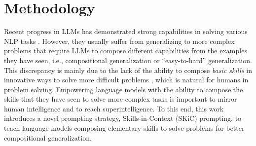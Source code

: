 





\section{Methodology}
\label{sec: methodology}














Recent progress in LLMs has demonstrated strong capabilities in solving various NLP tasks \citep{brown2020language, Radford2019LanguageMA, smith2022using, chowdhery2022palm, lewkowycz2022solving, sanh2021multitask, wei2021finetuned, mishra2022cross, chung2022scaling, ouyang2022training}. However, they usually suffer from generalizing to more complex problems that require LLMs to compose different capabilities \citep{zhou2022least} from the examples they have seen, i.e., compositional generalization or ``easy-to-hard'' generalization. This discrepancy is mainly due to the lack of the ability to compose \textit{basic skills} in innovative ways to solve more difficult problems \citep{dziri2023faith}, which is natural for humans in problem solving. Empowering language models with the ability to compose the skills that they have seen to solve more complex tasks is important to mirror human intelligence and to reach superintelligence. To this end, this work introduces a novel prompting strategy, Skills-in-Context (SKiC) prompting, to teach language models composing elementary skills to solve problems for better compositional generalization.









